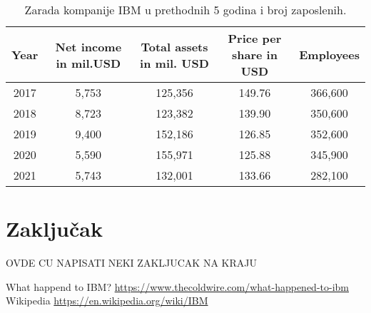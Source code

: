 \documentclass[a4paper]{article}
\begin{document}
\begin{table}[h!]
\begin{center}
\caption{Zarada kompanije IBM u prethodnih 5 godina i broj zaposlenih. \cite{tabela}}
\begin{tabular}{|c|c|c|c|c|} \hline
Year& Net income in mil.USD& Total assets in mil. USD& Price per share in USD& Employees \\ \hline
2017	&5,753	&125,356	&149.76	&366,600\\ \hline
2018	&8,723	&123,382	&139.90	&350,600\\ \hline
2019	&9,400	&152,186	&126.85	&352,600\\ \hline
2020	&5,590	&155,971	&125.88	&345,900\\ \hline
2021	&5,743	&132,001	&133.66	&282,100\\ \hline
\end{tabular}
\label{tab:tabela1}
\end{center}
\end{table}

\section{Zaključak}
OVDE CU NAPISATI NEKI ZAKLJUCAK NA KRAJU %

\renewcommand{\refname}{Literatura}
\begin{thebibliography}{9}

 What happend to IBM? 
\url{https://www.thecoldwire.com/what-happened-to-ibm}
 Wikipedia %
\url{https://en.wikipedia.org/wiki/IBM}
\end{thebibliography}
\end{document}
